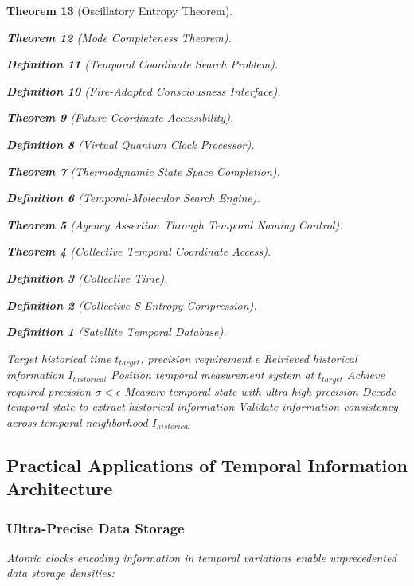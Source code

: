\documentclass[12pt,a4paper]{article}
\newtheorem{theorem}{Theorem}[section]
\newtheorem{definition}[theorem]{Definition}
\begin{document}
\begin{theorem}[Oscillatory Entropy Theorem]
\begin{theorem}[Mode Completeness Theorem]
\begin{enumerate}
\begin{definition}[Temporal Coordinate Search Problem]
\begin{algorithm}
\begin{definition}[Fire-Adapted Consciousness Interface]
\begin{theorem}[Future Coordinate Accessibility]
\begin{definition}[Virtual Quantum Clock Processor]
\begin{itemize}
\begin{itemize}
\begin{theorem}[Thermodynamic State Space Completion]
\begin{definition}[Temporal-Molecular Search Engine]
\begin{theorem}[Agency Assertion Through Temporal Naming Control]
\begin{remark}
\begin{theorem}[Collective Temporal Coordinate Access]
\begin{definition}[Collective Time]
\begin{definition}[Collective S-Entropy Compression]
\begin{definition}[Satellite Temporal Database]
\begin{algorithm}
\begin{table}[h]
{{\begin{algorithm}[H]
\caption{Temporal Archaeological Data Retrieval}
\begin{algorithmic}[1]
\REQUIRE Target historical time $t_{target}$, precision requirement $\epsilon$
\ENSURE Retrieved historical information $I_{historical}$
\STATE Position temporal measurement system at $t_{target}$
\STATE Achieve required precision $\sigma < \epsilon$
\STATE Measure temporal state with ultra-high precision
\STATE Decode temporal state to extract historical information
\STATE Validate information consistency across temporal neighborhood
\RETURN $I_{historical}$
\end{algorithmic}
\end{algorithm}

\subsection{Practical Applications of Temporal Information Architecture}

\subsubsection{Ultra-Precise Data Storage}

Atomic clocks encoding information in temporal variations enable unprecedented data storage densities:

\begin{figure}[H]
\centering
{}
\end{figure}}}
\end{table}
\end{algorithm}
\end{definition}
\end{definition}
\end{definition}
\end{theorem}
\end{remark}
\end{theorem}
\end{definition}
\end{theorem}
\end{itemize}
\end{itemize}
\end{definition}
\end{theorem}
\end{definition}
\end{algorithm}
\end{definition}
\end{enumerate}
\end{theorem}
\end{theorem}
\end{document}
